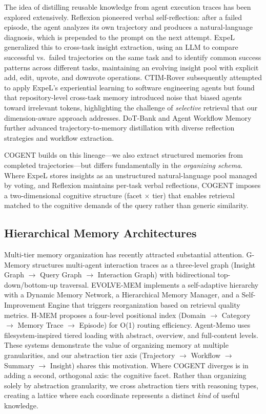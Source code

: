 \documentclass[letterpaper]{article} %
\begin{document}
The idea of distilling reusable knowledge from agent execution traces has been explored extensively. Reflexion \cite{reflexion} pioneered verbal self-reflection: after a failed episode, the agent analyzes its own trajectory and produces a natural-language diagnosis, which is prepended to the prompt on the next attempt. ExpeL \cite{expel} generalized this to cross-task insight extraction, using an LLM to compare successful vs.\ failed trajectories on the same task and to identify common success patterns across different tasks, maintaining an evolving insight pool with explicit add, edit, upvote, and downvote operations. CTIM-Rover \cite{ctim-rover} subsequently attempted to apply ExpeL's experiential learning to software engineering agents but found that repository-level cross-task memory introduced noise that biased agents toward irrelevant tokens, highlighting the challenge of \emph{selective} retrieval that our dimension-aware approach addresses. DoT-Bank \cite{dot-bank} and Agent Workflow Memory \cite{awm} further advanced trajectory-to-memory distillation with diverse reflection strategies and workflow extraction.

\textsc{COGENT} builds on this lineage---we also extract structured memories from completed trajectories---but differs fundamentally in the \emph{organizing schema}. Where ExpeL stores insights as an unstructured natural-language pool managed by voting, and Reflexion maintains per-task verbal reflections, \textsc{COGENT} imposes a two-dimensional cognitive structure (facet $\times$ tier) that enables retrieval matched to the cognitive demands of the query rather than generic similarity.

\subsection{Hierarchical Memory Architectures}

Multi-tier memory organization has recently attracted substantial attention. G-Memory \cite{g-memory} structures multi-agent interaction traces as a three-level graph (Insight Graph $\rightarrow$ Query Graph $\rightarrow$ Interaction Graph) with bidirectional top-down/bottom-up traversal. EVOLVE-MEM \cite{evolve-mem} implements a self-adaptive hierarchy with a Dynamic Memory Network, a Hierarchical Memory Manager, and a Self-Improvement Engine that triggers reorganization based on retrieval quality metrics. H-MEM \cite{h-mem} proposes a four-level positional index (Domain $\rightarrow$ Category $\rightarrow$ Memory Trace $\rightarrow$ Episode) for O(1) routing efficiency. Agent-Memo uses filesystem-inspired tiered loading with abstract, overview, and full-content levels. These systems demonstrate the value of organizing memory at multiple granularities, and our abstraction tier axis (Trajectory $\rightarrow$ Workflow $\rightarrow$ Summary $\rightarrow$ Insight) shares this motivation. Where \textsc{COGENT} diverges is in adding a second, orthogonal axis: the cognitive facet. Rather than organizing solely by abstraction granularity, we cross abstraction tiers with reasoning types, creating a lattice where each coordinate represents a distinct \emph{kind} of useful knowledge.
\end{document}

